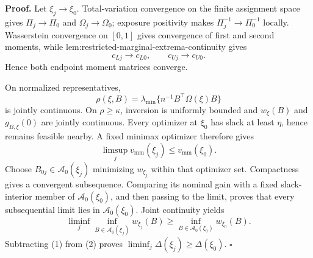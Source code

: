 \textbf{Proof.}
Let \(\xi_j\to\xi_0\).  Total-variation convergence on the finite assignment space gives \(\Pi_j\to\Pi_0\) and \(\Omega_j\to\Omega_0\); exposure positivity makes \(\Pi_j^{-1}\to\Pi_0^{-1}\) locally.  Wasserstein convergence on \([0,1]\) gives convergence of first and second moments, while lem:restricted-marginal-extrema-continuity gives
\[
c_{Lj}\to c_{L0},\qquad c_{Uj}\to c_{U0}.
\]
Hence both endpoint moment matrices converge.

On normalized representatives,
\[
\rho(\xi,B)=\lambda_{\min}\{n^{-1}B^{\top}\Omega(\xi)B\}
\]
is jointly continuous.  On \(\rho\ge\kappa\), inversion is uniformly bounded and \(w_\xi(B)\) and \(g_{B,\xi}(0)\) are jointly continuous.  Every optimizer at \(\xi_0\) has slack at least \(\eta\), hence remains feasible nearby.  A fixed minimax optimizer therefore gives
\[
\limsup_jv_{\mathrm{mm}}(\xi_j)\le v_{\mathrm{mm}}(\xi_0).
\tag{1}
\]
Choose \(B_{0j}\in\mathcal A_0(\xi_j)\) minimizing \(w_{\xi_j}\) within that optimizer set.  Compactness gives a convergent subsequence.  Comparing its nominal gain with a fixed slack-interior member of \(\mathcal A_0(\xi_0)\), and then passing to the limit, proves that every subsequential limit lies in \(\mathcal A_0(\xi_0)\).  Joint continuity yields
\[
\liminf_j\inf_{B\in\mathcal A_0(\xi_j)}w_{\xi_j}(B)
\ge\inf_{B\in\mathcal A_0(\xi_0)}w_{\xi_0}(B).
\tag{2}
\]
Subtracting (1) from (2) proves \(\liminf_j\Delta(\xi_j)\ge\Delta(\xi_0)\). \(\square\)